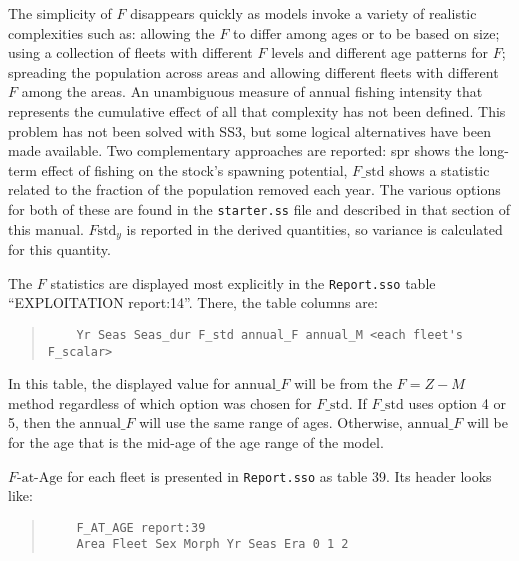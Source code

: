 The simplicity of $F$ disappears quickly as models invoke a variety of realistic complexities such as: allowing the $F$ to differ among ages or to be based on size; using a collection of fleets with different $F$ levels and different age patterns for $F$; spreading the population across areas and allowing different fleets with different $F$ among the areas. An unambiguous measure of annual fishing intensity that represents the cumulative effect of all that complexity has not been defined. This problem has not been solved with SS3, but some logical alternatives have been made available. Two complementary approaches are reported: \gls{spr} shows the long-term effect of fishing on the stock's spawning potential, $F\text{\_std}$ shows a statistic related to the fraction of the population removed each year. The various options for both of these are found in the \texttt{starter.ss} file and described in that section of this manual. $F\text{std}_y$ is reported in the derived quantities, so variance is calculated for this quantity.


The $F$ statistics are displayed most explicitly in the \texttt{Report.sso} table ``EXPLOITATION report:14''. There, the table columns are:
\begin{quote}
	\begin{verbatim}
	Yr Seas Seas_dur F_std annual_F annual_M <each fleet's F_scalar>
	\end{verbatim}
\end{quote}

In this table, the displayed value for $\text{annual\_}F$ will be from the $F=Z-M$ method regardless of which option was chosen for $F\text{\_std}$. If $F\text{\_std}$ uses option 4 or 5, then the $\text{annual\_}F$ will use the same range of ages. Otherwise, $\text{annual\_}F$ will be for the age that is the mid-age of the age range of the model.

$F\text{-at-Age}$ for each fleet is presented in \texttt{Report.sso} as table 39. Its header looks like:
\begin{quote}
	\begin{verbatim}
	F_AT_AGE report:39
	Area Fleet Sex Morph Yr Seas Era 0 1 2
	\end{verbatim}
\end{quote}

